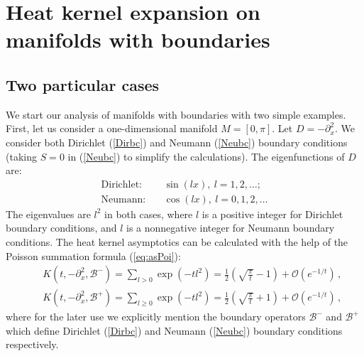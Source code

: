 \section{Heat kernel expansion on manifolds with boundaries}\label{sec5}
\subsection{Two particular cases}\label{s5cases}
We start our analysis of manifolds with boundaries with two simple
examples. First, let us consider a one-dimensional manifold
$M=[0,\pi ]$. Let $D=-\partial_x^2$. We consider both Dirichlet
(\ref{Dirbc}) and Neumann (\ref{Neubc}) boundary conditions (taking
$S=0$ in (\ref{Neubc}) to simplify the calculations). The eigenfunctions
of $D$ are:
\begin{eqnarray}
{\mbox{Dirichlet:}}& &\ \sin (lx),\ l=1,2,\dots ;\nonumber\\
{\mbox{Neumann:}}& &\ \cos (lx), \ l=0,1,2,\dots 
\label{1dimeigen}
\end{eqnarray}
The eigenvalues are $l^2$ in both cases, where $l$ is a positive integer
for Dirichlet boundary conditions, and $l$ is a nonnegative integer for
Neumann boundary conditions. The heat kernel asymptotics can be calculated
with the help of the Poisson summation formula (\ref{eq:asPoi}):
\begin{eqnarray}
&&K(t,-\partial_x^2,\mathcal{B}^-)=\sum_{l>0} \exp (-tl^2)=
\frac 12 \left( \sqrt{\frac{\pi}t} -1 \right) 
+\mathcal{O} \left( e^{-1/t} \right)
\,,\label{1dimDir}\\
&&K(t,-\partial_x^2,\mathcal{B}^+)=\sum_{l\ge 0} \exp (-tl^2)=
\frac 12 \left( \sqrt{\frac{\pi}t} +1 \right) 
+\mathcal{O} \left( e^{-1/t} \right)
\,,\label{1dimNeu}
\end{eqnarray}
where for the later use we explicitly mention the boundary operators
$\mathcal{B}^-$ and $\mathcal{B}^+$ which define Dirichlet (\ref{Dirbc})
and Neumann (\ref{Neubc}) boundary conditions respectively.

